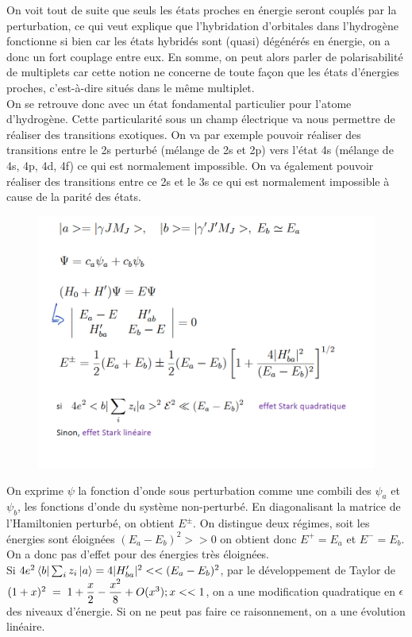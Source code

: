 On voit tout de suite que seuls les états proches en énergie seront couplés par la perturbation, ce qui veut explique que l'hybridation d'orbitales dans l'hydrogène fonctionne si bien car les états hybridés sont (quasi) dégénérés en énergie, on a donc un fort couplage entre eux. En somme, on peut alors parler de polarisabilité de multiplets car cette notion ne concerne de toute façon que les états d'énergies proches, c'est-à-dire situés dans le même multiplet.\\

On se retrouve donc avec un état fondamental particulier pour l'atome d'hydrogène. Cette particularité sous un champ électrique va nous permettre de réaliser des transitions exotiques. On va par exemple pouvoir réaliser des transitions entre le 2s perturbé (mélange de 2s et 2p) vers l'état 4s (mélange de 4s, 4p, 4d, 4f) ce qui est normalement impossible. On va également pouvoir réaliser des transitions entre ce 2s et le 3s ce qui est normalement impossible à cause de la parité des états.\\

\begin{figure}[htp]
    \centering
    \includegraphics[scale=0.7]{Images2/EffetStark.PNG}
\end{figure}

On exprime $\psi$ la fonction d'onde sous perturbation comme une combili des $\psi_a$ et $\psi_b$, les fonctions d'onde du système non-perturbé. En diagonalisant la matrice de l'Hamiltonien perturbé, on obtient $E^{\pm}$. On distingue deux régimes, soit les énergies sont éloignées $(E_a - E_b)^2 >> 0$ on obtient donc $E^+ = E_a$ et $E^- = E_b$. On a donc pas d'effet pour des énergies très éloignées.\\
Si $4e^2\bra{b}\sum_iz_i\ket{a} = 4|H'_{ba}|^2<<(E_a - E_b)^2 $, par le développement de Taylor de $(1 + x)^2\; = \; 1 + \dfrac{x}{2} - \dfrac{x^2}{8} + O(x^3);x<<1$, on a une modification quadratique en $\epsilon$ des niveaux d'énergie. Si on ne peut pas faire ce raisonnement, on a une évolution linéaire.\\

